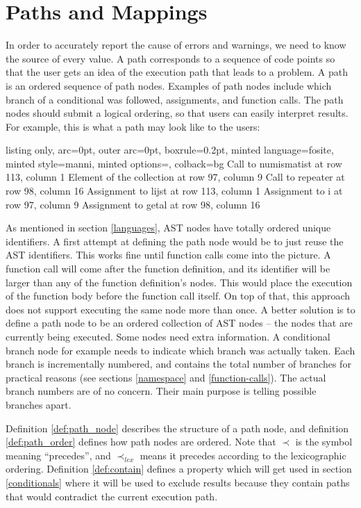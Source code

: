 \documentclass[a4paper, 16pt, oneside]{Thesis}
\begin{document}
\section{Paths and Mappings}\label{paths-and-mappings}

In order to accurately report the cause of errors and warnings, we need
to know the source of every value. A path corresponds to a sequence of
code points so that the user gets an idea of the execution path that
leads to a problem. A path is an ordered sequence of path nodes.
Examples of path nodes include which branch of a conditional was
followed, assignments, and function calls. The path nodes should submit
a logical ordering, so that users can easily interpret results. For
example, this is what a path may look like to the users:

\begin{tcblisting}{listing only, 
  arc=0pt,
  outer arc=0pt, 
  boxrule=0.2pt,
  minted language=fosite,
  minted style=manni,
  minted options={},
  colback=bg }
Call to numismatist at row 113, column 1
Element of the collection at row 97, column 9
Call to repeater at row 98, column 16
Assignment to lijst at row 113, column 1
Assignment to i at row 97, column 9
Assignment to getal at row 98, column 16
\end{tcblisting}

As mentioned in section \ref{languages}, AST nodes have totally ordered
unique identifiers. A first attempt at defining the path node would be
to just reuse the AST identifiers. This works fine until function calls
come into the picture. A function call will come after the function
definition, and its identifier will be larger than any of the function
definition's nodes. This would place the execution of the function body
before the function call itself. On top of that, this approach does not
support executing the same node more than once. A better solution is to
define a path node to be an ordered collection of AST nodes -- the nodes
that are currently being executed. Some nodes need extra information. A
conditional branch node for example needs to indicate which branch was
actually taken. Each branch is incrementally numbered, and contains the
total number of branches for practical reasons (see sections
\ref{namespace} and \ref{function-calls}). The actual branch numbers are
of no concern. Their main purpose is telling possible branches apart.

Definition \ref{def:path_node} describes the structure of a path node,
and definition \ref{def:path_order} defines how path nodes are ordered.
Note that \(\prec\) is the symbol meaning ``precedes'', and
\(\prec_{lex}\) means it precedes according to the lexicographic
ordering. Definition \ref{def:contain} defines a property which will get
used in section \ref{conditionals} where it will be used to exclude
results because they contain paths that would contradict the current
execution path.
\end{document}

